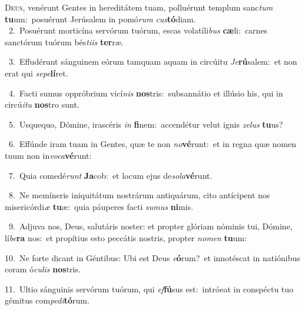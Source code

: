 \lettrine{\initial\textcolor{\initialcolor}{D}}{eus,} venérunt Gentes in hereditátem tuam, polluérunt templum sanc\textit{tum} \textbf{tu}\-um:~\star posuérunt Jerúsalem in pomó\textit{rum} \textit{cus}\-\textbf{tó}diam.\\
{\numbfont\textcolor{\numbcolor}{~2.}}~Posuérunt morticína servórum tuórum, escas volatíli\textit{bus} \textbf{cæ}\-li:~\star carnes sanctórum tuórum bés\-\textit{ti}\-\textit{is} \textbf{ter}\-ræ.\par
{\numbfont\textcolor{\numbcolor}{~3.}}~Effudérunt sánguinem eórum tamquam aquam in circúitu \textit{Je}\-\textbf{rú}salem:~\star et non erat qui \textit{se}\-\textit{pe}\textbf{lí}ret.\par
{\numbfont\textcolor{\numbcolor}{~4.}}~Facti sumus oppróbrium vicí\textit{nis} \textbf{nos}\-tris:~\star subsannátio et illúsio his, qui in circú\-\textit{i}\-\textit{tu} \textbf{nos}\-tro sunt.\par
{\numbfont\textcolor{\numbcolor}{~5.}}~Usquequo, Dómine, irascéris \textit{in} \textbf{fi}\-nem:~\star accendétur velut ignis \textit{ze}\-\textit{lus} \textbf{tu}\-us?\par
{\numbfont\textcolor{\numbcolor}{~6.}}~Effúnde iram tuam in Gentes, quæ te non \textit{no}\-\textbf{vé}runt:~\star et in regna quæ nomen tuum non in\-\textit{vo}\-\textit{ca}\textbf{vé}runt:\par
{\numbfont\textcolor{\numbcolor}{~7.}}~Quia comedé\textit{runt} \textbf{Ja}\-cob:~\star et locum ejus de\-\textit{so}\-\textit{la}\textbf{vé}runt.\par
{\numbfont\textcolor{\numbcolor}{~8.}}~Ne memíneris iniquitátum nostrárum antiquárum, cito antícipent nos misericórdi\textit{æ} \textbf{tu}\-æ:~\star quia páuperes facti \textit{su}\-\textit{mus} \textbf{ni}\-mis.\par
{\numbfont\textcolor{\numbcolor}{~9.}}~Adjuva nos, Deus, salutáris noster: et propter glóriam nóminis tui, Dómine, lí\-\textit{be}\-\textbf{ra} nos:~\star et propítius esto peccátis nostris, propter \textit{no}\-\textit{men} \textbf{tu}\-um:\par
{\numbfont\textcolor{\numbcolor}{10.}}~Ne forte dicant in Géntibus: Ubi est Deus \textit{e}\-\textbf{ó}rum?~\star et innotéscat in natiónibus coram ó\-\textit{cu}\-\textit{lis} \textbf{nos}\-tris.\par
{\numbfont\textcolor{\numbcolor}{11.}}~Ultio sánguinis servórum tuórum, qui \textit{ef}\-\textbf{fú}sus est:~\star intróeat in conspéctu tuo gémitus com\-\textit{pe}\-\textit{di}\textbf{tó}rum.\par
